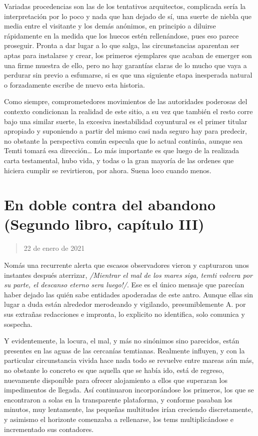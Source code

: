 \documentclass[
]{book}
\begin{document}
Variadas procedencias son las de los tentativos arquitectos, complicada sería la interpretación por lo poco y nada que han dejado de sí, una suerte de niebla que media entre el visitante y los demás anónimos, en principio a diluirse rápidamente en la medida que los huecos estén rellenándose, pues eso parece proseguir. Pronta a dar lugar a lo que salga, las circunstancias aparentan ser aptas para instalarse y crear, los primeros ejemplares que acaban de emerger son una firme muestra de ello, pero no hay garantías claras de lo mucho que vaya a perdurar sin previo a esfumarse, si es que una siguiente etapa inesperada natural o forzadamente escribe de nuevo esta historia.

Como siempre, comprometedores movimientos de las autoridades poderosas del contexto condicionan la realidad de este sitio, a su vez que también el resto corre bajo una similar suerte, la excesiva inestabilidad coyuntural es el primer titular apropiado y suponiendo a partir del mismo casi nada seguro hay para predecir, no obstante la perspectiva común especula que lo actual continúa, aunque sea Temti tomará esa dirección\ldots{} Lo más importante es que luego de la realizada carta testamental, hubo vida, y todas o la gran mayoría de las ordenes que hiciera cumplir se revirtieron, por ahora. Suena loco cuando menos.

\hypertarget{en-doble-contra-del-abandono-segundo-libro-capuxedtulo-iii}{%
\section{En doble contra del abandono (Segundo libro, capítulo III)}\label{en-doble-contra-del-abandono-segundo-libro-capuxedtulo-iii}}

\begin{quote}
22 de enero de 2021
\end{quote}

Nomás una recurrente alerta que escasos observadores vieron y capturaron unos instantes después aterrizar, \emph{/Mientrar el mal de los mares siga, temti volvera por su parte, el descanso eterno sera luego!/}. Ese es el único mensaje que parecían haber dejado las quién sabe entidades apoderadas de este antro. Aunque ellas sin lugar a duda están alrededor merodeando y vigilando, presumiblemente A. por sus extrañas redacciones e impronta, lo explicito no identifica, solo comunica y sospecha.

Y evidentemente, la locura, el mal, y más no sinónimos sino parecidos, están presentes en las aguas de las cercanías temtianas. Realmente influyen, y con la particular circunstancia vivida hace nada todo se revuelve entre mareas aún más, no obstante lo concreto es que aquella que se había ido, está de regreso, nuevamente disponible para ofrecer alojamiento a ellos que superaran los impedimentos de llegada. Así continuaron incorporándose los primeros, los que se encontraron a solas en la transparente plataforma, y conforme pasaban los minutos, muy lentamente, las pequeñas multitudes irían creciendo discretamente, y asimismo el horizonte comenzaba a rellenarse, los tems multiplicándose e incrementado sus contadores.
\end{document}
